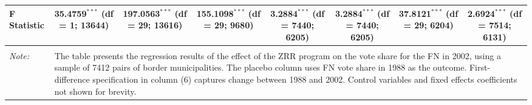 \begin{table}
{\begin{tabular}{@{\extracolsep{5pt}}lccccccc}
F Statistic & 35.4759$^{***}$ (df = 1; 13644) & 197.0563$^{***}$ (df = 29; 13616) & 155.1098$^{***}$ (df = 29; 9680) & 3.2884$^{***}$ (df = 7440; 6205) & 3.2884$^{***}$ (df = 7440; 6205) & 37.8121$^{***}$ (df = 29; 6204) & 2.6924$^{***}$ (df = 7514; 6131) \\ 
\hline 
\hline \\[-1.8ex] 
\textit{Note:}  & \multicolumn{7}{l}{\parbox{0.95\linewidth}{\footnotesize The table presents the regression results of the effect of the ZRR program on the vote share for the FN in 2002, using a sample of 7412 pairs of border municipalities. The placebo column uses FN vote share in 1988 as the outcome. First-difference specification in column (6) captures change between 1988 and 2002. Control variables and fixed effects coefficients not shown for brevity.}} \\ 
\end{tabular}
}%
\end{table}
